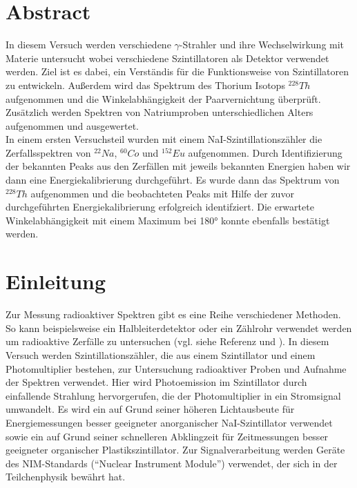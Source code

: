 \documentclass[12pt,listof=totoc]{scrartcl}
\title{\vspace{0cm}{\Huge Fortgeschrittenen-Praktikum I:\\ \vspace{1cm} Szintillationszähler}}
\author{Saskia Bondza\\Simon Stephan}
\date{durchgeführt am 12.10.2016 und 13.10.2016}
\begin{document}
\maketitle
\newpage

\section*{Abstract}

In diesem Versuch werden verschiedene $\gamma$-Strahler und ihre Wechselwirkung mit Materie untersucht wobei verschiedene Szintillatoren als Detektor verwendet werden. Ziel ist es dabei, ein Verständis für die Funktionsweise von Szintillatoren zu entwickeln. Außerdem wird das Spektrum des Thorium Isotops $^{228}Th$ aufgenommen  und die Winkelabhängigkeit der Paarvernichtung überprüft. Zusätzlich werden Spektren von Natriumproben unterschiedlichen Alters aufgenommen und ausgewertet.\\

In einem ersten Versuchsteil wurden mit einem NaI-Szintillationszähler die Zerfallsspektren von  $^{22}Na$, $^{60}Co$ und $^{152}Eu$ aufgenommen. Durch Identifizierung der bekannten Peaks aus den Zerfällen mit jeweils bekannten Energien haben wir dann eine Energiekalibrierung durchgeführt. Es wurde dann das Spektrum von $^{228}Th$ aufgenommen und die beobachteten Peaks mit Hilfe der zuvor durchgeführten Energiekalibrierung erfolgreich identifziert. 
Die erwartete Winkelabhängigkeit mit einem Maximum bei 180° konnte ebenfalls bestätigt werden.


\newpage

\thispagestyle{empty}
\tableofcontents
\newpage

\section{Einleitung}


Zur Messung radioaktiver Spektren gibt es eine Reihe verschiedener Methoden. So kann beispielsweise ein Halbleiterdetektor oder ein Zählrohr verwendet werden um radioaktive Zerfälle zu untersuchen (vgl. siehe Referenz \cite{staat} und \cite{staat}). In diesem Versuch werden Szintillationszähler, die aus einem Szintillator und einem Photomultiplier bestehen, zur Untersuchung radioaktiver Proben und Aufnahme der Spektren verwendet. Hier wird Photoemission im Szintillator durch einfallende Strahlung hervorgerufen, die der Photomultiplier in ein Stromsignal umwandelt.
Es wird ein auf Grund seiner höheren Lichtausbeute für Energiemessungen besser geeigneter anorganischer NaI-Szintillator verwendet sowie ein auf Grund seiner schnelleren Abklingzeit für Zeitmessungen besser geeigneter organischer Plastikszintillator.
Zur Signalverarbeitung werden Geräte des NIM-Standards ("`Nuclear Instrument Module"') verwendet, der sich in der Teilchenphysik bewährt hat.\\
\end{document}
